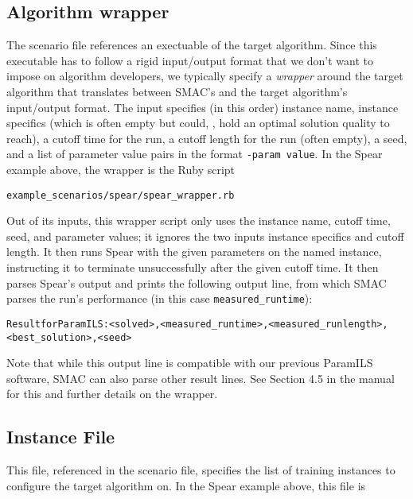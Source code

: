 \documentclass[11pt,letterpaper,twoside]{article}
\begin{document}
\subsection{Algorithm wrapper}
The scenario file references an exectuable of the target algorithm. Since this executable has to follow a rigid input/output format that we don't want to impose on algorithm developers, we typically specify a \emph{wrapper} around the target algorithm that translates between SMAC's and the target algorithm's input/output format.
The input specifies (in this order) instance name, instance specifics (which is often empty but could, \eg{}, hold an optimal solution quality to reach), a cutoff time for the run, a cutoff length for the run (often empty), a seed, and a list of parameter value pairs in the format {\footnotesize\texttt{-param value}}. 
In the Spear example above, the wrapper is the Ruby script 

{\footnotesize
\begin{alltt}
example_scenarios/spear/spear_wrapper.rb
\end{alltt}
}

Out of its inputs, this wrapper script only uses the instance name, cutoff time, seed, and parameter values; it ignores the two inputs instance specifics and cutoff length. It then runs Spear with the given parameters on the named instance, instructing it to terminate unsuccessfully after the given cutoff time. It then parses Spear's output and prints the following output line, from which SMAC parses the run's performance (in this case \texttt{\footnotesize{measured\_runtime}}):

{\footnotesize
\begin{alltt}
Result for ParamILS: <solved>, <measured_runtime>, <measured_runlength>, 
<best_solution>, <seed>
\end{alltt}
}

Note that while this output line is compatible with our previous ParamILS software, SMAC can also parse other result lines. See Section 4.5 in the manual for this and further details on the wrapper.


\subsection{Instance File}
This file, referenced in the scenario file, specifies the list of training instances to configure the target algorithm on. 
In the Spear example above, this file is
\end{document}
